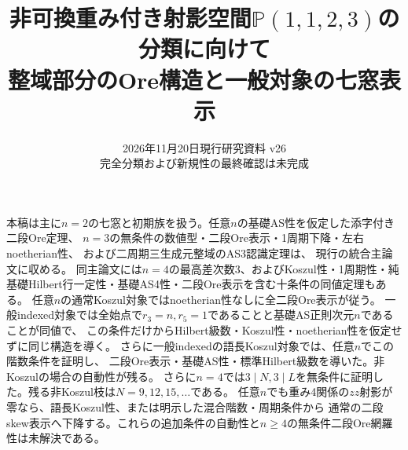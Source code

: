 \documentclass[11pt,a4paper]{ltjsarticle}
\title{非可換重み付き射影空間\texorpdfstring{$\mathbb P(1,1,2,3)$}{P(1,1,2,3)}の分類に向けて\\
\large 整域部分のOre構造と一般対象の七窓表示}
\author{}
\date{2026年11月20日\quad 現行研究資料 v26\\
\small 完全分類および新規性の最終確認は未完成}
\theoremstyle{definition}
\begin{document}
\maketitle

本稿は主に$n=2$の七窓と初期族を扱う。任意$n$の基礎AS性を仮定した添字付き二段Ore定理、
$n=3$の無条件の数値型・二段Ore表示・1周期下降・左右noetherian性、
および二周期三生成元整域のAS3認識定理は、
現行の統合主論文に収める。
同主論文には$n=4$の最高差次数3、およびKoszul性・1周期性・純基礎Hilbert行一定性・基礎AS4性・二段Ore表示を含む十条件の同値定理もある。
任意$n$の通常Koszul対象ではnoetherian性なしに全二段Ore表示が従う。
一般indexed対象では全始点で$r_3=n,r_5=1$であることと基礎AS正則次元$n$であることが同値で、
この条件だけからHilbert級数・Koszul性・noetherian性を仮定せずに同じ構造を導く。
さらに一般indexedの語長Koszul対象では、任意$n$でこの階数条件を証明し、
二段Ore表示・基礎AS性・標準Hilbert級数を導いた。非Koszulの場合の自動性が残る。
さらに$n=4$では$3\mid N,3\mid L$を無条件に証明した。残る非Koszul枝は$N=9,12,15,\ldots$である。
任意$n$でも重み4関係の$zz$射影が零なら、語長Koszul性、または明示した混合階数・周期条件から
通常の二段skew表示へ下降する。これらの追加条件の自動性と$n\geq4$の無条件二段Ore網羅性は未解決である。
\end{document}
